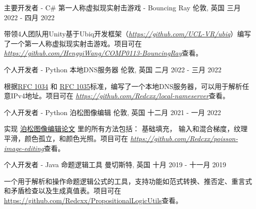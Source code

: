 \begin{cventries}
  \cventry
    {主要开发者 - C\#} %
    {第一人称虚拟现实射击游戏 - Bouncing Ray} %
    {伦敦, 英国} %
    {三月 2022 - 四月 2022} %
    {
      \begin{cvitems} %
        \item {带领4人团队用Unity基于Ubiq开发框架（\href{https://github.com/UCL-VR/ubiq}{\textit{https://github.com/UCL-VR/ubiq}}）编写了一个第一人称虚拟现实射击游戏。项目可在 \href{https://github.com/HengyiWang/COMP0113-BouncingRay}{\textit{https://github.com/HengyiWang/COMP0113-BouncingRay}}查看。}
      \end{cvitems}
    }
  

  \cventry
    {个人开发者 - Python} %
    {本地DNS服务器} %
    {伦敦, 英国} %
    {二月 2022 - 三月 2022} %
    {
      \begin{cvitems} %
        \item {根据\href{https://datatracker.ietf.org/doc/html/rfc1034}{RFC 1034} 和 \href{https://datatracker.ietf.org/doc/html/rfc1035}{RFC 1035}标准，编写了一个本地DNS服务器，可以用于解析任意IPv4地址。项目可在 \href{https://github.com/Redcxx/local-nameserver}{\textit{https://github.com/Redcxx/local-nameserver}}查看。}
      \end{cvitems}
    }
    
  \cventry
    {个人开发者 - Python} %
    {泊松图像编辑} %
    {伦敦, 英国} %
    {十二月 2021 - 一月 2022} %
    {
      \begin{cvitems} %
        \item {实现 \href{https://www.cs.jhu.edu/~misha/Fall07/Papers/Perez03.pdf}{泊松图像编辑论文} 里的所有方法包括： 基础填充， 输入和混合梯度，纹理平滑，颜色孤立，和颜色光照。项目可在 \href{https://github.com/Redcxx/poisson-image-editing}{\textit{https://github.com/Redcxx/poisson-image-editing}}查看。}
      \end{cvitems}
    }


  \cventry
    {个人开发者 - Java} %
    {命题逻辑工具} %
    {曼切斯特, 英国} %
    {十月 2019 - 十一月 2019} %
    {
      \begin{cvitems} %
        \item {一个用于解析和操作命题逻辑公式的工具，支持功能如范式转换、推否定、重言式和矛盾检查以及生成真值表。项目可在\href{https://github.com/Redcxx/PropositionalLogicUtils}{https://github.com/Redcxx/PropositionalLogicUtils}查看。}
      \end{cvitems}
    }


\end{cventries}
